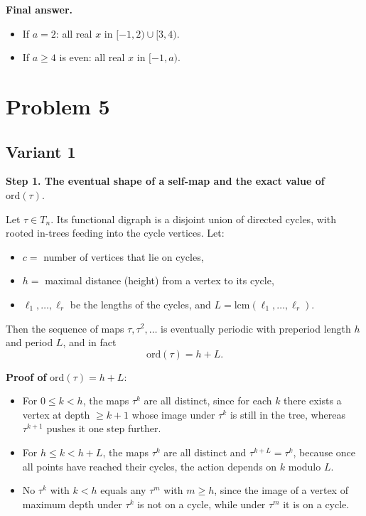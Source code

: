 \documentclass[12pt,a4paper]{article}
\theoremstyle{definition}
\begin{document}
    \textbf{Final answer.}
    \begin{itemize}
        \item If $a = 2$: all real $x$ in $[-1, 2) \cup [3, 4)$.
        \item If $a \geq 4$ is even: all real $x$ in $[-1, a)$.
    \end{itemize}

    \section{Problem 5}
    \subsection{Variant 1}
    \textbf{Step 1. The eventual shape of a self-map and the exact value of} $\mathrm{ord}(\tau)$.

    Let $\tau \in T_n$. Its functional digraph is a disjoint union of directed cycles, with rooted in-trees feeding into the cycle vertices. Let:
    \begin{itemize}
        \item $c =$ number of vertices that lie on cycles,
        \item $h =$ maximal distance (height) from a vertex to its cycle,
        \item $\ell_1, \ldots, \ell_r$ be the lengths of the cycles, and $L = \mathrm{lcm}(\ell_1, \ldots, \ell_r)$.
    \end{itemize}

    Then the sequence of maps $\tau, \tau^2, \ldots$ is eventually periodic with preperiod length $h$ and period $L$, and in fact
    $$\mathrm{ord}(\tau) = h + L.$$

    \textbf{Proof of} $\mathrm{ord}(\tau) = h + L$:
    \begin{itemize}
        \item For $0 \leq k < h$, the maps $\tau^k$ are all distinct, since for each $k$ there exists a vertex at depth $\geq k + 1$ whose image under $\tau^k$ is still in the tree, whereas $\tau^{k+1}$ pushes it one step further.
        \item For $h \leq k < h + L$, the maps $\tau^k$ are all distinct and $\tau^{k+L} = \tau^k$, because once all points have reached their cycles, the action depends on $k$ modulo $L$.
        \item No $\tau^k$ with $k < h$ equals any $\tau^m$ with $m \geq h$, since the image of a vertex of maximum depth under $\tau^k$ is not on a cycle, while under $\tau^m$ it is on a cycle.
    \end{itemize}
\end{document}
